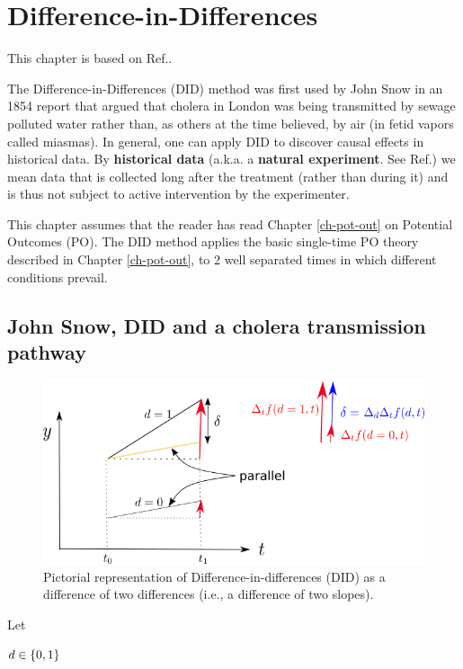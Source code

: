 \chapter{Difference-in-Differences}
\label{ch-did}

This chapter is based on
Ref.\cite{book-mixtape}.


The Difference-in-Differences (DID)
method was first used by John Snow
in an 1854 report that
argued that 
cholera in London
was being transmitted 
by sewage polluted water
rather than, as others
at the time believed, by air (in fetid vapors
called miasmas).
In general, one can
apply DID to discover 
causal effects in historical data.
By {\bf historical data} (a.k.a. a {\bf natural
experiment}. See Ref.\cite{wiki-nat-exp})
we mean data that is collected long
after the treatment (rather than during it)
 and is thus
not  subject to 
active intervention
by the experimenter. 

This chapter assumes that the
reader has read Chapter \ref{ch-pot-out}
on Potential Outcomes (PO).
The DID method
applies the basic single-time
PO theory described in Chapter \ref{ch-pot-out},
to 2
well separated times
in which
different conditions prevail.



\section{John Snow, DID  
and a cholera
transmission pathway}


\begin{figure}[h!]
\centering
\includegraphics[width=5in]
{did/dif-dif.png}
\caption{Pictorial representation of
 Difference-in-differences (DID) as a difference
of two differences (i.e., 
a difference of two slopes).} 
\label{fig-dif-dif}
\end{figure}

Let

$d\in \{0,1\}$


